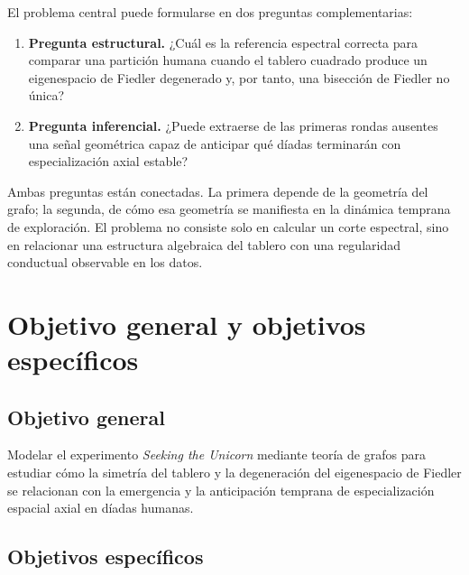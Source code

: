 \documentclass[journal]{IEEEtran}
\begin{document}
El problema central puede formularse en dos preguntas complementarias:
\begin{enumerate}
\item \textbf{Pregunta estructural.} ¿Cuál es la referencia espectral correcta para comparar una partición humana cuando el tablero cuadrado produce un eigenespacio de Fiedler degenerado y, por tanto, una bisección de Fiedler no única?
\item \textbf{Pregunta inferencial.} ¿Puede extraerse de las primeras rondas ausentes una señal geométrica capaz de anticipar qué díadas terminarán con especialización axial estable?
\end{enumerate}

Ambas preguntas están conectadas. La primera depende de la geometría del grafo; la segunda, de cómo esa geometría se manifiesta en la dinámica temprana de exploración. El problema no consiste solo en calcular un corte espectral, sino en relacionar una estructura algebraica del tablero con una regularidad conductual observable en los datos.

\section{Objetivo general y objetivos específicos}\label{sec:objetivos}

\subsection{Objetivo general}

Modelar el experimento \emph{Seeking the Unicorn} mediante teoría de grafos para estudiar cómo la simetría del tablero y la degeneración del eigenespacio de Fiedler se relacionan con la emergencia y la anticipación temprana de especialización espacial axial en díadas humanas.

\subsection{Objetivos específicos}
\end{document}

